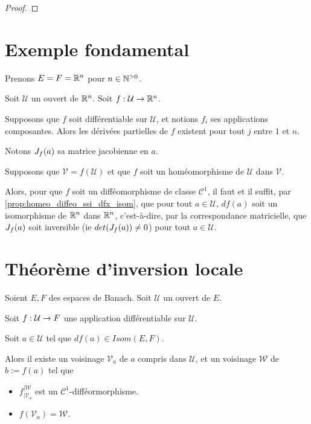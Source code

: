 \ifdefined\outputproof
\begin{proof}

\end{proof}
\fi

\section{Exemple fondamental}

Prenons $E = F = \mathbb{R}^{n}$ pour $n \in \mathbb{N}^{> 0}$.

Soit $\mathcal{U}$ un ouvert de $\mathbb{R}^{n}$.
Soit $f : \mathcal{U} \rightarrow \mathbb{R}^{n}$.

Supposons que $f$ soit différentiable sur $\mathcal{U}$, et notions $f_{i}$ ses
applications composantes. Alors les dérivées partielles de $f$ existent pour
tout $j$ entre $1$ et $n$.

Notons $J_{f}(a)$ sa matrice jacobienne en $a$.

Supposons que $\mathcal{V} = f(\mathcal{U})$ et que $f$ soit un homéomorphisme
de $\mathcal{U}$ dans $\mathcal{V}$.

Alors, pour que $f$ soit un difféomorphisme de classe $\mathcal{C}^{1}$, il faut
et il suffit, par \ref{prop:homeo_diffeo_ssi_dfx_isom}, que pour tout $a \in
\mathcal{U}$, $df(a)$ soit un isomorphisme de $\mathbb{R}^{n}$ dans $\mathbb{R}^{n}$,
c'est-à-dire, par la correspondance matricielle, que $J_{f}(a)$
soit inversible (ie $det(J_{f}(a)) \neq 0$) pour tout $a \in
\mathcal{U}$.

\section{Théorème d'inversion locale}

\begin{theorem} 
	\label{theorem:local_inversion}
	Soient $E, F$ des espaces de Banach.
	Soit $\mathcal{U}$ un ouvert de $E$.

	Soit $f : \mathcal{U} \rightarrow F$ une application différentiable sur
	$\mathcal{U}$.

	Soit $a \in \mathcal{U}$ tel que $df(a) \in Isom(E, F)$.

	Alors il existe un voisinage $\mathcal{V}_{a}$ de $a$ compris dans
	$\mathcal{U}$, et un voisinage $\mathcal{W}$ de $b := f(a)$ tel que

	\begin{itemize}
		\item $f^{|\mathcal{W}}_{|\mathcal{V}_{a}}$ est un $\mathcal{C}^{1}$-difféormorphisme.
		\item $f(\mathcal{V}_{a}) = \mathcal{W}$.
	\end{itemize}
\end{theorem}

